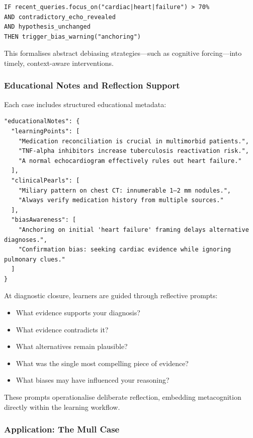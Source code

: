 \begin{verbatim}
IF recent_queries.focus_on("cardiac|heart|failure") > 70%
AND contradictory_echo_revealed
AND hypothesis_unchanged
THEN trigger_bias_warning("anchoring")
\end{verbatim}

This formalises abstract debiasing strategies—such as cognitive forcing—into
timely, context-aware interventions.

\subsubsection{Educational Notes and Reflection Support}

Each case includes structured educational metadata:

\begin{verbatim}
"educationalNotes": {
  "learningPoints": [
    "Medication reconciliation is crucial in multimorbid patients.",
    "TNF-alpha inhibitors increase tuberculosis reactivation risk.",
    "A normal echocardiogram effectively rules out heart failure."
  ],
  "clinicalPearls": [
    "Miliary pattern on chest CT: innumerable 1–2 mm nodules.",
    "Always verify medication history from multiple sources."
  ],
  "biasAwareness": [
    "Anchoring on initial 'heart failure' framing delays alternative diagnoses.",
    "Confirmation bias: seeking cardiac evidence while ignoring pulmonary clues."
  ]
}
\end{verbatim}

At diagnostic closure, learners are guided through reflective prompts:

\begin{itemize}
  \item What evidence supports your diagnosis?
  \item What evidence contradicts it?
  \item What alternatives remain plausible?
  \item What was the single most compelling piece of evidence?
  \item What biases may have influenced your reasoning?
\end{itemize}

These prompts operationalise deliberate reflection, embedding metacognition
directly within the learning workflow.

\subsubsection{Application: The Mull Case}

